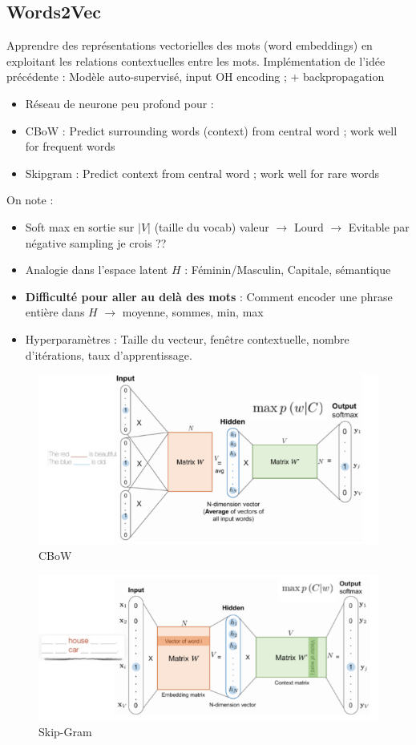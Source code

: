 \documentclass{article}
\theoremstyle{plain}%
\theoremstyle{definition}
\theoremstyle{remark}
\begin{document}
\subsection{Words2Vec}
Apprendre des représentations vectorielles des mots (word embeddings) en exploitant les relations contextuelles entre les mots.
Implémentation de l'idée précédente : Modèle auto-supervisé, input OH encoding ; + backpropagation 
\begin{itemize}
    \item Réseau de neurone peu profond pour :
    \item CBoW : Predict surrounding words (context) from central word ; work well for frequent words
    \item Skipgram : Predict context from central word ; work well for rare words
\end{itemize}
On note : \begin{itemize}
    \item Soft max en sortie sur $ \left| V \right|  $ (taille du vocab) valeur $\rightarrow$ Lourd $\rightarrow$ Evitable par négative sampling je crois ??
    \item Analogie dans l'espace latent $ H $ : Féminin/Masculin, Capitale, sémantique 
    \item \textbf{Difficulté pour aller au delà des mots} : Comment encoder une phrase entière dans $H$ $\rightarrow$ moyenne, sommes, min, max
    \item Hyperparamètres : Taille du vecteur, fenêtre contextuelle, nombre d'itérations, taux d'apprentissage.
\end{itemize}

\begin{figure}[htbp]
    \centering
    \includegraphics*[width=.75\textwidth]{CBoW.png}
    \caption{CBoW}
\end{figure}
\begin{figure}[htbp]
    \centering
    \includegraphics*[width=.75\textwidth]{skipgram.png}
    \caption{Skip-Gram}
\end{figure}
\end{document}
